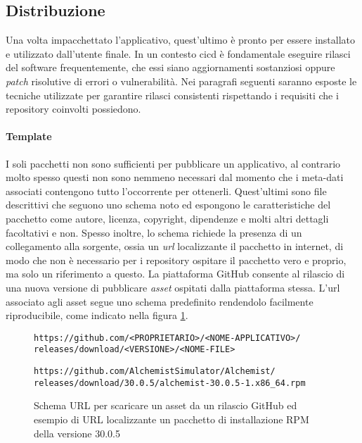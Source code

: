 
\subsection{Distribuzione}

Una volta impacchettato l'applicativo, quest'ultimo è pronto per essere installato e utilizzato dall'utente finale. In un contesto \ac{cicd} è fondamentale eseguire rilasci del software frequentemente, che essi siano aggiornamenti sostanziosi oppure \textit{patch} risolutive di errori o vulnerabilità. Nei paragrafi seguenti saranno esposte le tecniche utilizzate per garantire rilasci consistenti rispettando i requisiti che i repository coinvolti possiedono.

\paragraph{Template} I soli pacchetti non sono sufficienti per pubblicare un applicativo, al contrario molto spesso questi non sono nemmeno necessari dal momento che i meta-dati associati contengono tutto l'occorrente per ottenerli. Quest'ultimi sono file descrittivi che seguono uno schema noto ed espongono le caratteristiche del pacchetto come autore, licenza, copyright, dipendenze e molti altri dettagli facoltativi e non. Spesso inoltre, lo schema richiede la presenza di un collegamento alla sorgente, ossia un \textit{url} localizzante il pacchetto in internet, di modo che non è necessario per i repository ospitare il pacchetto vero e proprio, ma solo un riferimento a questo. La piattaforma GitHub consente al rilascio di una nuova versione di pubblicare \textit{asset} ospitati dalla piattaforma stessa. L'url associato agli asset segue uno schema predefinito rendendolo facilmente riproducibile, come indicato nella figura \ref{fig:github-assets-url}.
\begin{figure}[htb]\label{fig:github-assets-url}
	\centering
	\texttt{https://github.com/<PROPRIETARIO>/<NOME-APPLICATIVO>/\\ \tab releases/download/<VERSIONE>/<NOME-FILE>}
	
	\vspace{0.5cm}
	
	\texttt{https://github.com/AlchemistSimulator/Alchemist/\\ \tab releases/download/30.0.5/alchemist-30.0.5-1.x86\_64.rpm}
	\caption{Schema URL per scaricare un asset da un rilascio GitHub ed esempio di URL localizzante un pacchetto di installazione RPM della versione 30.0.5}
\end{figure}

